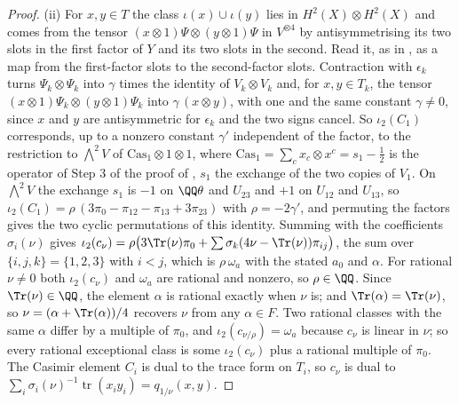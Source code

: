 \begin{proof}
(ii) For $x,y\in T$ the class $\iota(x)\cup\iota(y)$ lies in
$H^{2}(X)\otimes H^{2}(X)$ and comes from the tensor
$(x\otimes1)\Psi\otimes(y\otimes1)\Psi$ in $V^{\otimes4}$ by antisymmetrising
its two slots in the first factor of $Y$ and its two slots in the second.
Read it, as in , as a map from the first-factor slots to
the second-factor slots. Contraction with $\epsilon_{k}$ turns
$\Psi_{k}\otimes\Psi_{k}$ into $\gamma$ times the identity of
$V_{k}\otimes V_{k}$ and, for $x,y\in T_{k}$, the tensor
$(x\otimes1)\Psi_{k}\otimes(y\otimes1)\Psi_{k}$ into $\gamma\,(x\otimes y)$,
with one and the same constant $\gamma\ne0$, since $x$ and $y$ are
antisymmetric for $\epsilon_{k}$ and the two signs cancel. So $\iota_{2}(C_{1})$
corresponds, up to a nonzero constant $\gamma'$ independent of the factor, to
the restriction to $\bigwedge^{2}V$ of $\mathrm{Cas}_{1}\otimes1\otimes1$,
where $\mathrm{Cas}_{1}=\sum_{c}x_{c}\otimes x^{c}=s_{1}-\frac12$ is the
operator of Step 3 of the proof of , $s_{1}$ the
exchange of the two copies of $V_{1}$. On $\bigwedge^{2}V$ the exchange
$s_{1}$ is $-1$ on $\QQ\theta$ and $U_{23}$ and $+1$ on $U_{12}$ and $U_{13}$,
so $\iota_{2}(C_{1})=\rho\,(3\pi_{0}-\pi_{12}-\pi_{13}+3\pi_{23})$ with
$\rho=-2\gamma'$, and permuting the factors gives the two cyclic permutations
of this identity. Summing with the coefficients $\sigma_{i}(\nu)$ gives
$\iota_{2}(c_{\nu})=\rho\bigl(3\Tr(\nu)\pi_{0}+\sum\sigma_{k}(4\nu-\Tr(\nu))
\pi_{ij}\bigr)$, the sum over $\{i,j,k\}=\{1,2,3\}$ with $i<j$, which is
$\rho\,\omega_{a}$ with the stated $a_{0}$ and $\alpha$. For rational $\nu\ne0$
both $\iota_{2}(c_{\nu})$ and $\omega_{a}$ are rational and nonzero, so
$\rho\in\QQ$. Since
$\Tr(\nu)\in\QQ$, the element $\alpha$ is rational exactly when $\nu$ is; and
$\Tr(\alpha)=\Tr(\nu)$, so $\nu=(\alpha+\Tr(\alpha))/4$ recovers $\nu$ from
any $\alpha\in F$. Two rational classes with the same $\alpha$ differ by a
multiple of $\pi_{0}$, and $\iota_{2}(c_{\nu/\rho})=\omega_{a}$ because
$c_{\nu}$ is linear in $\nu$; so every rational exceptional class is some
$\iota_{2}(c_{\nu})$ plus a rational multiple of $\pi_{0}$. The Casimir element $C_{i}$ is dual to the trace form
on $T_{i}$, so $c_{\nu}$ is dual to $\sum_{i}\sigma_{i}(\nu)^{-1}
\operatorname{tr}(x_{i}y_{i})=q_{1/\nu}(x,y)$.


\end{proof}
